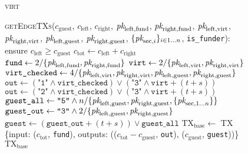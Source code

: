 \begin{figure}[H]
  \begin{processbox}{\textsc{virt}}
    \begin{algorithmic}[1]
      \State {}
      \State \textsc{getEdgeTXs}($c_{\mathrm{guest}}$, $c_{\mathrm{left}}$,
      $c_{\mathrm{right}}$, $\textit{pk}_{\mathrm{left}, \mathrm{fund}}$,
      $\textit{pk}_{\mathrm{right}, \mathrm{fund}}$, $\textit{pk}_{\mathrm{left}, \mathrm{virt}}$,
      $\textit{pk}_{\mathrm{right}, \mathrm{virt}}$, $\textit{pk}_{\mathrm{left},
      \mathrm{guest}}$, $\textit{pk}_{\mathrm{right}, \mathrm{guest}}$,
      $\{\textit{pk}_{\mathrm{sec}, i}\}_{i \in 1 \dots n}$, \texttt{is\_funder}):
      \Indent
        \State ensure $c_{\mathrm{left}} \geq c_{\mathrm{guest}}$
        \State $c_{\mathrm{tot}} \gets c_{\mathrm{left}} + c_{\mathrm{right}}$
        \State $\texttt{fund} \gets 2/\{\textit{pk}_{\mathrm{left}, \mathrm{fund}},
        \textit{pk}_{\mathrm{right}, \mathrm{fund}}\}$
        \State $\texttt{virt} \gets 2/\{\textit{pk}_{\mathrm{left}, \mathrm{virt}},
        \textit{pk}_{\mathrm{right}, \mathrm{virt}}\}$
        \State $\texttt{virt\_checked} \gets 4/\{\textit{pk}_{\mathrm{left},
        \mathrm{virt}}, \textit{pk}_{\mathrm{right}, \mathrm{virt}}, \textit{pk}_{\mathrm{left},
        \mathrm{guest}}, \textit{pk}_{\mathrm{right}, \mathrm{guest}}\}$
          \State $\texttt{out} \gets (\texttt{"1"} \wedge
          \texttt{virt\_checked}) \vee (\texttt{"3"} \wedge \texttt{virt} + (t +
          s))$
          \label{code:virtual-layer:edge-txs:funder-out}
        \Else \: 
          \State $\texttt{out} \gets (\texttt{"2"} \wedge
          \texttt{virt\_checked}) \vee (\texttt{"3"} \wedge \texttt{virt} + (t +
          s))$
        \EndIf
        \State $\texttt{guest\_all} \gets \texttt{"5"} \wedge
        n/\{\textit{pk}_{\mathrm{left}, \mathrm{guest}}, \textit{pk}_{\mathrm{right},
        \mathrm{guest}}, \{\textit{pk}_{\mathrm{sec}, 1 \dots n}\}\}$
        \State $\texttt{guest\_out} \gets \texttt{"3"} \wedge
        2/\{\textit{pk}_{\mathrm{left}, \mathrm{guest}}, \textit{pk}_{\mathrm{right},
        \mathrm{guest}}\}$
        \State $\texttt{guest} \gets (\texttt{guest\_out} + (t + s)) \vee
        \texttt{guest\_all}$
        \label{code:virtual-layer:edge-txs:guest-output}
        \State $\mathrm{TX}_{\mathrm{base}} \gets$ TX \{input:
        ($c_{\mathrm{tot}}$, \texttt{fund}), outputs: (($c_{\mathrm{tot}} -
        c_{\mathrm{guest}}$, \texttt{out}), ($c_{\mathrm{guest}}$,
        \texttt{guest}))\}
        \State \Return $\mathrm{TX}_{\mathrm{base}}$
      \EndIndent
    \end{algorithmic}
  \end{processbox}
  \caption{}
  \label{code:virtual-layer:edge-txs}
\end{figure}


